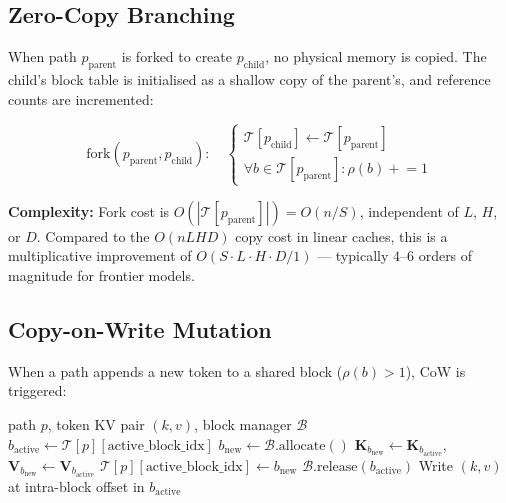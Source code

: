 \documentclass[10pt,twocolumn]{article}
\begin{document}
\subsection{Zero-Copy Branching}

When path $p_{\text{parent}}$ is forked to create $p_{\text{child}}$, no physical memory is copied. The child's block table is initialised as a shallow copy of the parent's, and reference counts are incremented:

\begin{equation}
\text{fork}(p_{\text{parent}}, p_{\text{child}}): \quad
\begin{cases}
\mathcal{T}[p_{\text{child}}] \leftarrow \mathcal{T}[p_{\text{parent}}] \\
\forall b \in \mathcal{T}[p_{\text{parent}}]: \rho(b) \mathrel{+}= 1
\end{cases}
\end{equation}

\textbf{Complexity:} Fork cost is $O(|\mathcal{T}[p_{\text{parent}}]|) = O(n/S)$, independent of $L$, $H$, or $D$. Compared to the $O(nLHD)$ copy cost in linear caches, this is a multiplicative improvement of $O(S \cdot L \cdot H \cdot D / 1)$ — typically $4$--$6$ orders of magnitude for frontier models.

\subsection{Copy-on-Write Mutation}

When a path appends a new token to a shared block ($\rho(b) > 1$), CoW is triggered:

\begin{algorithm}
\caption{Copy-on-Write Token Append}
\begin{algorithmic}[1]
\Require path $p$, token KV pair $(k, v)$, block manager $\mathcal{B}$
\State $b_{\text{active}} \leftarrow \mathcal{T}[p][\text{active\_block\_idx}]$
 
    \State $b_{\text{new}} \leftarrow \mathcal{B}.\text{allocate}()$
    \State $\mathbf{K}_{b_{\text{new}}} \leftarrow \mathbf{K}_{b_{\text{active}}}$, \quad $\mathbf{V}_{b_{\text{new}}} \leftarrow \mathbf{V}_{b_{\text{active}}}$
    \State $\mathcal{T}[p][\text{active\_block\_idx}] \leftarrow b_{\text{new}}$
    \State $\mathcal{B}.\text{release}(b_{\text{active}})$ 
\EndIf
\State Write $(k, v)$ at intra-block offset in $b_{\text{active}}$
\end{algorithmic}
\end{algorithm}
\end{document}
